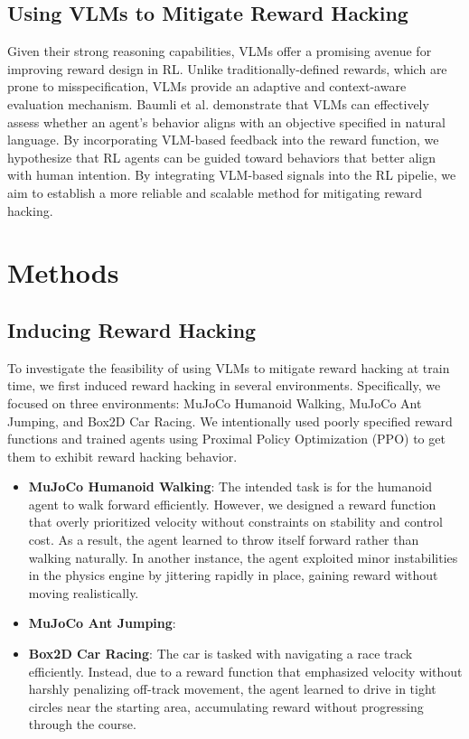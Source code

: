 \documentclass{article}
\begin{document}
\subsection{Using VLMs to Mitigate Reward Hacking}
Given their strong reasoning capabilities, VLMs offer a promising avenue for improving reward design in RL. Unlike traditionally-defined rewards, which are prone to misspecification, VLMs provide an adaptive and context-aware evaluation mechanism. Baumli et al. demonstrate that VLMs can effectively assess whether an agent's behavior aligns with an objective specified in natural language. By incorporating VLM-based feedback into the reward function, we hypothesize that RL agents can be guided toward behaviors that better align with human intention. By integrating VLM-based signals into the RL pipelie, we aim to establish a more reliable and scalable method for mitigating reward hacking.

\section{Methods}
\subsection{Inducing Reward Hacking}
To investigate the feasibility of using VLMs to mitigate reward hacking at train time, we first induced reward hacking in several environments. Specifically, we focused on three environments: MuJoCo Humanoid Walking, MuJoCo Ant Jumping, and Box2D Car Racing. We intentionally used poorly specified reward functions and trained agents using Proximal Policy Optimization (PPO) to get them to exhibit reward hacking behavior.

\begin{itemize}
\item \textbf{MuJoCo Humanoid Walking}: The intended task is for the humanoid agent to walk forward efficiently. However, we designed a reward function that overly prioritized velocity without constraints on stability and control cost. As a result, the agent learned to throw itself forward rather than walking naturally. In another instance, the agent exploited minor instabilities in the physics engine by jittering rapidly in place, gaining reward without moving realistically.

\item \textbf{MuJoCo Ant Jumping}:

\item \textbf{Box2D Car Racing}: The car is tasked with navigating a race track efficiently. Instead, due to a reward function that emphasized velocity without harshly penalizing off-track movement, the agent learned to drive in tight circles near the starting area, accumulating reward without progressing through the course.
\end{itemize}
\end{document}
